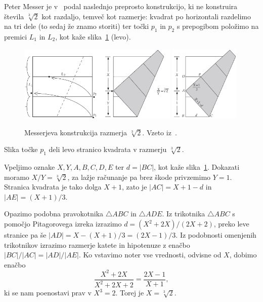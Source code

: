 Peter Messer je v~\cite{messer1986} podal naslednjo preprosto konstrukcijo, ki ne konstruira števila $\sqrt[3]{2}$ kot razdaljo, temveč kot razmerje: kvadrat po horizontali razdelimo na tri dele (to sedaj že znamo storiti) ter točki $p_1$ in $p_2$ s prepogibom položimo na premici $L_1$ in $L_2$, kot kaže slika~\ref{fig:messer} (levo).
\begin{figure}[h]
    \centering
    \includegraphics[width=0.68\textwidth]{images/starogr_problemi/messer1.png}
    \includegraphics[width=0.3\textwidth]{images/starogr_problemi/messer2.png}
    \caption[Messerjeva konstrukcija]{Messerjeva konstrukcija razmerja $\sqrt[3]{2}$. Vzeto iz~\cite[str.\ 67--68]{hull2013}.}
    \label{fig:messer}
\end{figure}
\begin{trditev}
    Slika točke $p_1$ deli levo stranico kvadrata v razmerju $\sqrt[3]{2}$.
\end{trditev}
\begin{dokaz}
    Vpeljimo oznake $X, Y, A, B, C, D, E$ ter $d = |BC|$, kot kaže slika~\ref{fig:messer}. Dokazati moramo $X/Y = \sqrt[3]{2}$, za lažje računanje pa brez škode privzemimo $Y=1$. Stranica kvadrata je tako dolga $X+1$, zato je $|AC| = X+1-d$ in $|AE| = (X+1)/3$.

    Opazimo podobna pravokotnika $\triangle ABC$ in $\triangle ADE$. Iz trikotnika $\triangle ABC$ s pomočjo Pitagorovega izreka izrazimo $d = (X^2+2X)/(2X+2)$, preko leve stranice pa še $|AD| = X - (X+1)/3 = (2X-1)/3$. Iz podobnosti omenjenih trikotnikov izrazimo razmerje katete in hipotenuze z enačbo $|BC|/|AC| = |AD|/|AE|$. Ko vstavimo noter vse vrednosti, odvisne od $X$, dobimo enačbo
    $$ \frac{X^2 + 2X}{X^2 + 2X + 2} = \frac{2X - 1}{X + 1},$$
    ki se nam poenostavi prav v $X^3 = 2$. Torej je $X = \sqrt[3]{2}$.
\end{dokaz}

